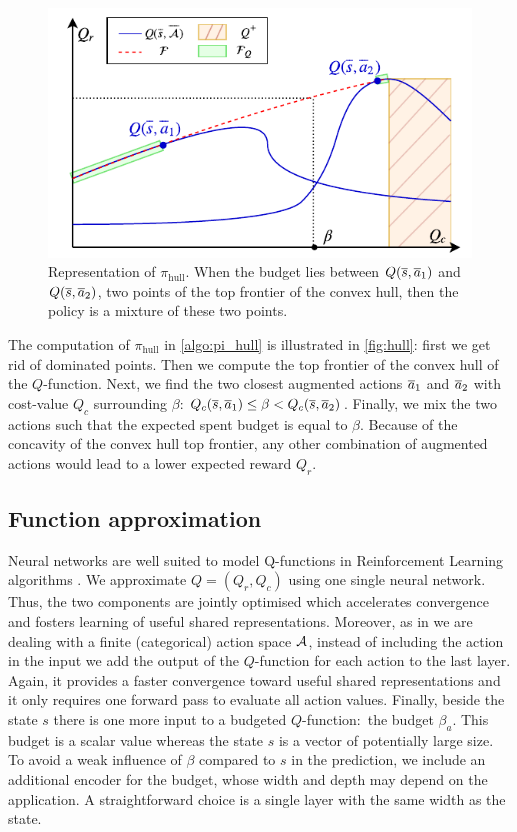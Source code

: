 \begin{figure}[ht]
	\centering
	\includegraphics[width=0.6\linewidth]{img/pi.pdf}
	\caption{Representation of $\pi_\text{hull}$. When the budget lies between $Q(\overline{s},\overline{a}_1)$ and $Q(\overline{s},\overline{a}_2)$, two points of the top frontier of the convex hull, then the policy is a mixture of these two points.}
	\label{fig:hull}
\end{figure}

The computation of $\pi_\text{hull}$ in \autoref{algo:pi_hull} is illustrated in \autoref{fig:hull}: first we get rid of dominated points. Then we compute the top frontier of the convex hull of the $Q$-function. Next, we find the two closest augmented actions $\overline{a}_1$ and $\overline{a}_2$ with cost-value $Q_c$ surrounding $\beta$:  $Q_c(\overline{s},\overline{a}_1)\leq\beta<Q_c(\overline{s},\overline{a}_2)$. Finally, we mix the two actions such that the expected spent budget is equal to $\beta$. Because of the concavity of the convex hull top frontier, any other combination of augmented actions would lead to a lower expected reward $Q_r$. 




\subsection{Function approximation}

Neural networks are well suited to model Q-functions in Reinforcement Learning algorithms \citep{Riedmiller2005,Mnih2015}.  We approximate $Q = (Q_r, Q_c)$ using one single neural network. Thus, the two components are jointly optimised which accelerates convergence and fosters learning of useful shared representations. Moreover, as in \citep{Mnih2015} we are dealing with a finite (categorical) action space $\mathcal{A}$, instead of including the action in the input we add the output of the $Q$-function for each action to the last layer. Again, it provides a faster convergence toward useful shared representations and it only requires one forward pass to evaluate all action values. Finally, beside the state $s$ there is one more input to a budgeted $Q$-function:~the budget $\beta_a$. This budget is a scalar value whereas the state $s$ is a vector of potentially large size. To avoid a weak influence of $\beta$ compared to $s$ in the prediction, we include an additional encoder for the budget, whose width and depth may depend on the application. A straightforward choice is a single layer with the same width as the state. 

